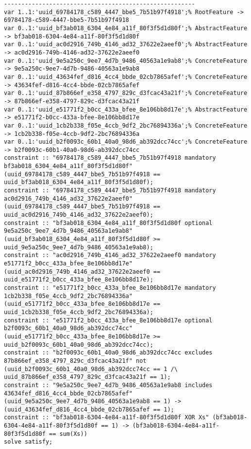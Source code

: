 \documentclass[11pt]{article}
\begin{document}
\begin{verbatim}
-------------------------------------------------------
var 1..1:'uuid_69784178_c589_4447_bbe5_7b51b97f4918';% RootFeature -> 69784178-c589-4447-bbe5-7b51b97f4918
var 0..1:'uuid_bf3ab018_6304_4e84_a11f_80f3f5d1d80f';% AbstractFeature -> bf3ab018-6304-4e84-a11f-80f3f5d1d80f
var 0..1:'uuid_ac0d2916_749b_4146_ad32_37622e2aeef0';% AbstractFeature -> ac0d2916-749b-4146-ad32-37622e2aeef0
var 0..1:'uuid_9e5a250c_9ee7_4d7b_9486_40563a1e9ab8';% ConcreteFeature -> 9e5a250c-9ee7-4d7b-9486-40563a1e9ab8
var 0..1:'uuid_43634fef_d816_4cc4_bbde_02cb7865afef';% ConcreteFeature -> 43634fef-d816-4cc4-bbde-02cb7865afef
var 0..1:'uuid_87b866ef_e358_4797_829c_d3fcac43a21f';% ConcreteFeature -> 87b866ef-e358-4797-829c-d3fcac43a21f
var 0..1:'uuid_e51771f2_b0cc_433a_bfee_8e106bb8d17e';% AbstractFeature -> e51771f2-b0cc-433a-bfee-8e106bb8d17e
var 0..1:'uuid_1cb2b338_f05e_4ccb_9df2_2bc76894336a';% ConcreteFeature -> 1cb2b338-f05e-4ccb-9df2-2bc76894336a
var 0..1:'uuid_b2f0093c_60b1_40a0_98d6_ab392dcc74cc';% ConcreteFeature -> b2f0093c-60b1-40a0-98d6-ab392dcc74cc
constraint :: "69784178_c589_4447_bbe5_7b51b97f4918 mandatory bf3ab018_6304_4e84_a11f_80f3f5d1d80f" (uuid_69784178_c589_4447_bbe5_7b51b97f4918 == uuid_bf3ab018_6304_4e84_a11f_80f3f5d1d80f);
constraint :: "69784178_c589_4447_bbe5_7b51b97f4918 mandatory ac0d2916_749b_4146_ad32_37622e2aeef0" (uuid_69784178_c589_4447_bbe5_7b51b97f4918 == uuid_ac0d2916_749b_4146_ad32_37622e2aeef0);
constraint :: "bf3ab018_6304_4e84_a11f_80f3f5d1d80f optional 9e5a250c_9ee7_4d7b_9486_40563a1e9ab8" (uuid_bf3ab018_6304_4e84_a11f_80f3f5d1d80f >= uuid_9e5a250c_9ee7_4d7b_9486_40563a1e9ab8);
constraint :: "ac0d2916_749b_4146_ad32_37622e2aeef0 mandatory e51771f2_b0cc_433a_bfee_8e106bb8d17e" (uuid_ac0d2916_749b_4146_ad32_37622e2aeef0 == uuid_e51771f2_b0cc_433a_bfee_8e106bb8d17e);
constraint :: "e51771f2_b0cc_433a_bfee_8e106bb8d17e mandatory 1cb2b338_f05e_4ccb_9df2_2bc76894336a" (uuid_e51771f2_b0cc_433a_bfee_8e106bb8d17e == uuid_1cb2b338_f05e_4ccb_9df2_2bc76894336a);
constraint :: "e51771f2_b0cc_433a_bfee_8e106bb8d17e optional b2f0093c_60b1_40a0_98d6_ab392dcc74cc" (uuid_e51771f2_b0cc_433a_bfee_8e106bb8d17e >= uuid_b2f0093c_60b1_40a0_98d6_ab392dcc74cc);
constraint :: "b2f0093c_60b1_40a0_98d6_ab392dcc74cc excludes 87b866ef_e358_4797_829c_d3fcac43a21f" not (uuid_b2f0093c_60b1_40a0_98d6_ab392dcc74cc == 1 /\ uuid_87b866ef_e358_4797_829c_d3fcac43a21f == 1);
constraint :: "9e5a250c_9ee7_4d7b_9486_40563a1e9ab8 includes 43634fef_d816_4cc4_bbde_02cb7865afef" (uuid_9e5a250c_9ee7_4d7b_9486_40563a1e9ab8 == 1) -> (uuid_43634fef_d816_4cc4_bbde_02cb7865afef == 1);
constraint :: "bf3ab018-6304-4e84-a11f-80f3f5d1d80f XOR Xs" (bf3ab018-6304-4e84-a11f-80f3f5d1d80f == 1) -> (bf3ab018-6304-4e84-a11f-80f3f5d1d80f == sum(Xs))
solve satisfy;
\end{verbatim}
\end{document}
